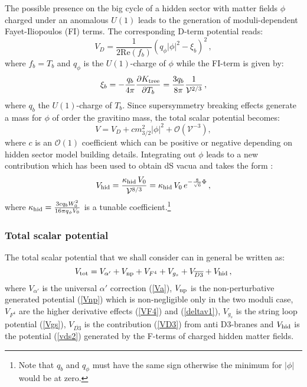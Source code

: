 \documentclass[11pt,a4paper]{article}
\newcommand{\be}{\begin{equation}}
\newcommand{\ee}{\end{equation}}
\newcommand\vo{{\mathcal{V}}}
\newcommand\mc{\mathcal}
\begin{document}
The possible presence on the big cycle of a hidden sector with matter fields $\phi$ charged under an anomalous $U(1)$ leads to the generation of moduli-dependent Fayet-Iliopoulos (FI) terms. The corresponding D-term potential reads:
\be
V_D = \frac{1}{2 \text{Re}(f_b)} \left(q_{\phi} |\phi|^2 - \xi_b\right)^2\,,
\ee 
where $f_b = T_b$ and $q_\phi$ is the $U(1)$-charge of $\phi$ while the FI-term is given by:
\be 
\xi_b = - \frac{q_b}{4 \pi} \frac{\partial K_{\rm tree}}{\partial T_b} = \frac{3 q_b}{8 \pi} \frac{1}{\vo^{2/3}}\,,
\ee 
where $q_b$ the $U(1)$-charge of $T_b$. Since supersymmetry breaking effects generate a mass for $\phi$ of order the gravitino mass, the total scalar potential becomes:
\be
V = V_D + c m_{3/2}^2 |\phi|^2 + \mc{O}\left(\vo^{-3}\right),
\ee
where $c$ is an $\mc{O}(1)$ coefficient which can be positive or negative depending on hidden sector model building details.
Integrating out $\phi$ leads to a new contribution which has been used to obtain dS vacua and takes the form \cite{ExplSeq}:
\be
V_{\rm hid} = \frac{\kappa_{\rm hid}\,V_0}{\vo^{8/3}} = \kappa_{\rm hid}\,V_0\,e^{-\frac{8}{\sqrt{6}}\Phi}\,,
\label{vds2}
\ee
where $\kappa_{\rm hid} = \frac{3 c q_b W_0^2}{16 \pi q_\phi V_0}$ is a tunable coefficient.\footnote{Note that $q_b$ and $q_\phi$ must have the same sign otherwise the minimum for $|\phi|$ would be at zero.}


\subsubsection{Total scalar potential}

The total scalar potential that we shall consider can in general be written as:
\be
V_{\rm tot} = V_{\alpha'} + V_{\rm np} +  V_{F^4} + V_{g_s} + V_{\overline{D3}} + V_{\rm hid}\,,
\label{Vtot}
\ee
where $V_{\alpha'}$ is the universal $\alpha'$ correction (\ref{Va}), $V_{\rm np}$ is the non-perturbative generated potential (\ref{Vnp}) which is non-negligible only in the two moduli case, $V_{F^4}$ are the higher derivative effects (\ref{VF4}) and (\ref{deltav1}), $V_{g_s}$ is the string loop potential (\ref{Vgs}), $V_{\overline{D3}}$ is the contribution (\ref{VD3}) from anti D3-branes and $V_{\rm hid}$ is the potential (\ref{vds2}) generated by the F-terms of charged hidden matter fields. 
\end{document}
